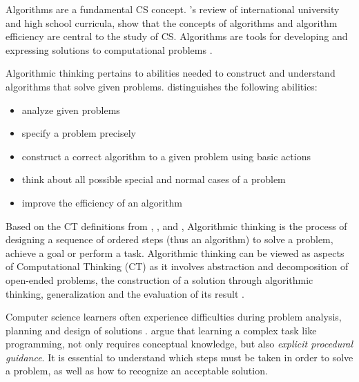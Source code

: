 Algorithms are a fundamental CS concept. 's review of international university and high school curricula, show that the concepts of algorithms and algorithm efficiency are central to the study of CS. Algorithms are tools for developing and expressing solutions to computational problems \cite{GroverPea2013}.


Algorithmic thinking pertains to abilities needed to construct and understand algorithms that solve given problems.  distinguishes the following abilities:
\begin{itemize}
\item analyze given problems
\item specify a problem precisely
\item construct a correct algorithm to a given problem using basic actions
\item think about all possible special and normal cases of a problem
\item improve the efficiency of an algorithm
\end{itemize}
Based on the CT definitions from \cite{CAS2014CT}, \cite{Google2017CT}, \cite{BrennanResnick2012} and \cite{CSTA2011CT}, Algorithmic thinking is the process of designing a sequence of ordered steps (thus an algorithm) to solve a problem, achieve a goal or perform a task\cite{corradini2017conceptions}. Algorithmic thinking can be viewed as aspects of Computational Thinking (CT) as it involves abstraction and decomposition of open-ended problems, the construction of a solution through algorithmic thinking, generalization and the evaluation of its result \cite{Wing2006}.



Computer science learners often experience difficulties during problem analysis, planning and design of solutions \cite{Hazzan2011}.  argue that learning a complex task like programming, not only requires conceptual knowledge, but also \emph{explicit procedural guidance}. It is essential to understand which steps must be taken in order to solve a problem, as well as how to recognize an acceptable solution.


